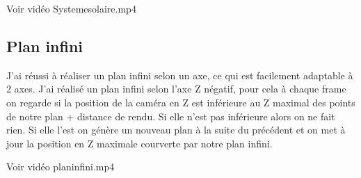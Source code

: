 \documentclass{article}
\begin{document}
  Voir vidéo Systemesolaire.mp4

\subsection{Plan infini}
  J'ai réussi à réaliser un plan infini selon un axe, ce qui est facilement adaptable à 2 axes.
  J'ai réalisé un plan infini selon l'axe Z négatif, pour cela à chaque frame on regarde si la position de la caméra en Z est inférieure au Z maximal des points de notre plan + distance de rendu.
  Si elle n'est pas inférieure alors on ne fait rien.
  Si elle l'est on génère un nouveau plan à la suite du précédent et on met à jour la position en Z maximale courverte par notre plan infini.

  Voir vidéo planinfini.mp4
\end{document}
